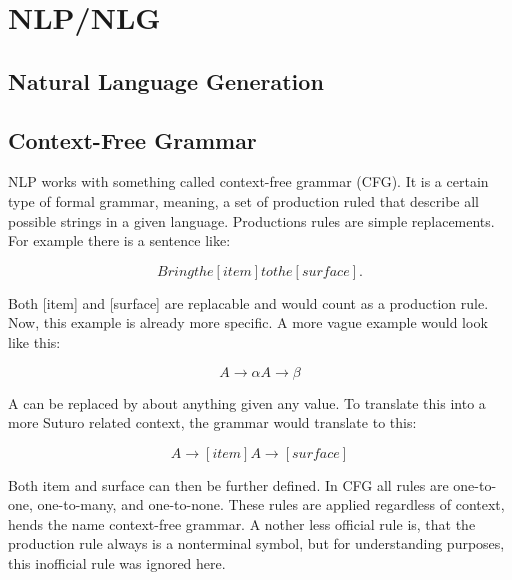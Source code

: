 \documentclass[main.tex]{subfiles}
\begin{document}
	

	\chapter{NLP/NLG}
  
  \section{Natural Language Generation}
  
  
  \section{Context-Free Grammar}
  NLP works with something called context-free grammar (CFG). It is a certain type of formal grammar, meaning, a set of  production ruled that describe all possible strings in a given language. Productions rules are simple replacements. For example there is a sentence like:

\begin{equation}
Bring the [item] to the [surface].
\end{equation}

Both [item] and [surface] are replacable and would count as a production rule. Now, this example is already more specific. A more vague example would look like this:

\begin{equation}
A → α
A → β
\end{equation}

A can be replaced by about anything given any value. To translate this into a more Suturo related context, the grammar would translate to this:

\begin{equation}
A → [item]
A → [surface]
\end{equation}

Both item and surface can then be further defined. In CFG all rules are one-to-one, one-to-many, and one-to-none. These rules are applied regardless of context, hends the name context-free grammar. A nother less official rule is, that the production rule always is a nonterminal symbol, but for understanding purposes, this inofficial rule was ignored here.
\end{document}
